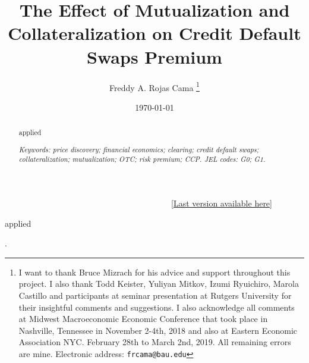 \documentclass[letterpaper,notitlepage,11pt]{article}
\author{Freddy A. Rojas Cama%
\thanks{I want to thank Bruce Mizrach for his advice and support throughout this project. I also thank Todd Keister, Yuliyan Mitkov, Izumi Ryuichiro, Marola Castillo and participants at seminar presentation at Rutgers University for their insightful comments and suggestions. I also acknowledge all comments at Midwest Macroeconomic Economic Conference that took place in Nashville, Tennessee in November 2-4th, 2018 and also at Eastern Economic Association NYC. February 28th to March 2nd, 2019. All remaining errors are mine. Electronic address: \texttt{frcama@bau.edu}}}
\affil{Bay Atlantic University \\\ Bah\c{c}e\c{s}ehir University}
\date{\today}
\title{The Effect of Mutualization and Collateralization on Credit Default Swaps Premium}
\newcommand{\myreferences}{/Users/freddyrojascama/Documents/Personal/SWP_BIB/bibfreddy_paper/references2019finInc}
\begin{document}
\maketitle
\ \ \ \ \ \ \ \ \ \ \ \ \ \ \ \ \ \ \ \ \ \ \ \ \ \ \  \ \ \ \ \ \ \ \ \ \ \ \   \ \href{https://drive.google.com/open?id=1KYgEwyFpzxbNWiHegJtg8kxBpsU8b4Pf}{[Last version available here]} 
\begin{abstract}

 applied \cite{Dablaetal14}

\vspace{0.2ex}
\textit{Keywords: price discovery; financial economics; clearing; credit default swaps; collateralization; mutualization; OTC; risk premium; CCP. JEL codes: G0; G1.}
\end{abstract}

\bigskip \newpage 

 applied 



\bigskip \newpage 


%
.
\end{document}
